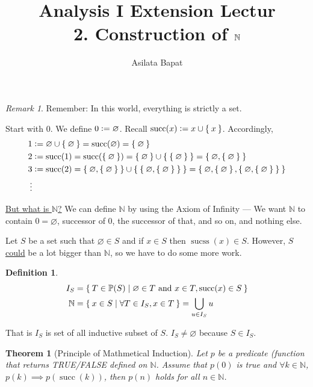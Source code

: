 \documentclass[12pt]{amsart}
\title[Construction of $\bbN$]
	{Analysis I Extension Lectur\\2. Construction of $\bbN$}
\author{Asilata Bapat}
\newcommand{\bbN}{\mathbb{N}}
\theoremstyle{plain}
\newtheorem*{thm}{Theorem}
\theoremstyle{remark}
\newtheorem*{rmk}{Remark}
\theoremstyle{definition}
\newtheorem*{define}{Definition}
\begin{document}
\maketitle
{}

\begin{rmk}
	Remember: In this world, everything is strictly a set.
\end{rmk}

Start with $0$. We define $0 \vcentcolon = \varnothing$.
Recall $\operatorname{succ}(x) \vcentcolon = x \cup \Set{x}$. 
Accordingly,
\begin{align*}
	1 &\vcentcolon = \varnothing \cup \Set{\varnothing} = \operatorname{succ}(\varnothing) = \Set{\varnothing}\\
	2 &\vcentcolon = \operatorname{succ}(1) = \operatorname{succ}(\Set{\varnothing}) = \Set{\varnothing} \cup \Set{\Set{\varnothing}} = \Set{\varnothing, \Set{\varnothing}}\\
	3 &\vcentcolon = \operatorname{succ}(2) = \Set{\varnothing, \Set{\varnothing}} \cup \Set{\Set{\varnothing, \Set{\varnothing}}} = \Set{\varnothing, \Set{\varnothing}, \Set{\varnothing, \Set{\varnothing}}}\\
	\vdots
\end{align*}

\ul{But what is $\bbN$?} We can define $\bbN$ by using the Axiom of Infinity --- We want $\bbN$ to contain $0 = \varnothing$, successor of $0$, the successor of that, and so on, and nothing else. 
\newline

Let $S$ be a set such that $\varnothing \in S$ and if $x \in S$ then $\operatorname{sucss}(x) \in S$. However, $S$ \ul{could} be a lot bigger than $\bbN$, so we have to do some more work. 

\begin{define}
	\begin{align*}
		I_S &= \Set{T \in \mathbb{P}(S)| \varnothing \in T \mbox{ and } x \in T,\operatorname{succ}(x) \in S}\\
		\bbN &= \Set{x \in S | \forall T \in I_S, x \in T} =  \bigcup\limits_{u \in I_S} u
	\end{align*}
\end{define}
That is $I_S$ is set of all inductive subset of $S$. $I_S \neq \varnothing$ because $S \in I_S$.

\begin{thm}[Principle of Mathmetical Induction]
	Let $p$ be a predicate (function that returns TRUE/FALSE defined on $\bbN$.
		Assume that $p(0)$ is true and $\forall k \in \bbN$, $p(k) \implies p(\operatorname{succ}(k))$, then $p(n)$ holds for all $n \in \bbN$.
\end{thm}
\end{document}
